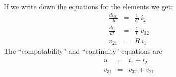 If we write down the equations for the elements we get:
\begin{eqnarray}
  \frac{dv_{31}}{dt} &=& \frac{1}{C}\ i_2 \label{eq:l13e1}\\
  \frac{di_{i}}{dt} &=& \frac{1}{L}\ v_{32} \label{eq:l13e2}\\
  v_{21} &=& R\ i_1 \label{eq:l13e3}
\end{eqnarray}
The ``compatability'' and ``continuity'' equations are
\begin{eqnarray}
  u &=& i_1 + i_2 \label{eq:l13e4}\\
  v_{31} &=& v_{32} + v_{21} \label{eq:l13e5}
\end{eqnarray}

\endinput
